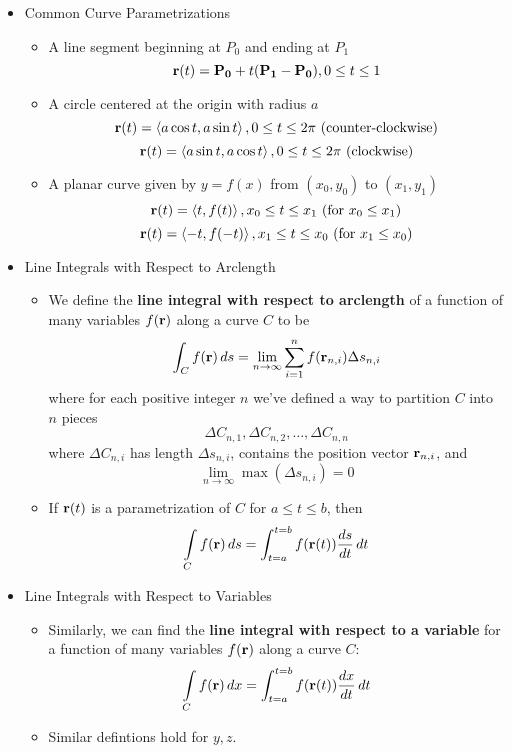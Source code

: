   \begin{itemize}

  \item Common Curve Parametrizations

    \begin{itemize}
      \item A line segment beginning at $P_0$ and ending at $P_1$
        \[
          \mathbf{r}(t) = \mathbf{P_0} + t(\mathbf{P_1}-\mathbf{P_0}), 0\leq t\leq 1
        \]
      \item A circle centered at the origin with radius $a$
        \[
          \mathbf{r}(t) = \left<a\cos t,a\sin t\right>, 0\leq t\leq 2\pi \text{ (counter-clockwise)}
        \]
        \[
          \mathbf{r}(t) = \left<a\sin t,a\cos t\right>, 0\leq t\leq 2\pi \text{ (clockwise)}
        \]
      \item A planar curve given by $y=f(x)$ from $(x_0,y_0)$ to $(x_1,y_1)$
        \[
          \mathbf{r}(t) = \left<t,f(t)\right>, x_0\leq t\leq x_1 \text{ (for } x_0\leq x_1 \text{)}
        \]
        \[
          \mathbf{r}(t) = \left<-t,f(-t)\right>, x_1\leq t\leq x_0 \text{ (for } x_1\leq x_0 \text{)}
        \]
    \end{itemize}
  
  \item Line Integrals with Respect to Arclength
  
    \begin{itemize}
    \item We define the \textbf{line integral with respect to arclength} of a function of many variables $f(\mathbf{r})$ along a curve $C$ to be 
      \[
        \int_C f(\mathbf{r})\,d{s} = \lim_{n\to\infty}\sum_{i=1}^n f(\mathbf{r}_{n,i})\Delta s_{n,i}
      \]
    where for each positive integer $n$ we've defined a way to partition $C$ into $n$ pieces 
      \[
        \Delta C_{n,1},\Delta C_{n,2},\dots,\Delta C_{n,n}
      \]
    where $\Delta C_{n,i}$ has length $\Delta s_{n,i}$, contains the position vector $\mathbf{r}_{n,i}$, and \[\lim_{n\to\infty} \max(\Delta s_{n,i}) = 0\]
    \item If $\mathbf{r}(t)$ is a parametrization of $C$ for $a \leq t \leq b$, then 
      \[
        \int\limits_C f(\mathbf{r})\,d{s}=\int_{t=a}^{t=b} f(\mathbf{r}(t))\frac{ds}{dt}\,d{t}
      \]
    \end{itemize}

  \newpage

  \item Line Integrals with Respect to Variables

    \begin{itemize}
    \item Similarly, we can find the \textbf{line integral with respect to a variable} for a function of many variables $f(\mathbf{r})$ along a curve $C$:
      \[
        \int\limits_C f(\mathbf{r})\,d{x}=\int_{t=a}^{t=b} f(\mathbf{r}(t))\frac{dx}{dt}\,d{t}
      \]
    \item Similar defintions hold for $y,z$.
    \end{itemize}


\end{itemize}
